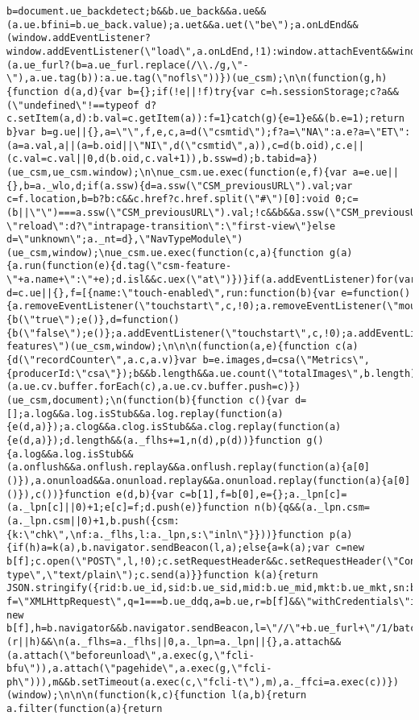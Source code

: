 \documentclass[
]{article}
\begin{document}
\begin{verbatim}
b=document.ue_backdetect;b&&b.ue_back&&a.ue&&(a.ue.bfini=b.ue_back.value);a.uet&&a.uet(\"be\");a.onLdEnd&&(window.addEventListener?window.addEventListener(\"load\",a.onLdEnd,!1):window.attachEvent&&window.attachEvent(\"onload\",a.onLdEnd));a.ueh&&a.ueh(0,window,\"load\",a.onLd,1);a.ue&&a.ue.tag&&(a.ue_furl?(b=a.ue_furl.replace(/\\./g,\"-\"),a.ue.tag(b)):a.ue.tag(\"nofls\"))})(ue_csm);\n\n(function(g,h){function d(a,d){var b={};if(!e||!f)try{var c=h.sessionStorage;c?a&&(\"undefined\"!==typeof d?c.setItem(a,d):b.val=c.getItem(a)):f=1}catch(g){e=1}e&&(b.e=1);return b}var b=g.ue||{},a=\"\",f,e,c,a=d(\"csmtid\");f?a=\"NA\":a.e?a=\"ET\":(a=a.val,a||(a=b.oid||\"NI\",d(\"csmtid\",a)),c=d(b.oid),c.e||(c.val=c.val||0,d(b.oid,c.val+1)),b.ssw=d);b.tabid=a})(ue_csm,ue_csm.window);\n\nue_csm.ue.exec(function(e,f){var a=e.ue||{},b=a._wlo,d;if(a.ssw){d=a.ssw(\"CSM_previousURL\").val;var c=f.location,b=b?b:c&&c.href?c.href.split(\"#\")[0]:void 0;c=(b||\"\")===a.ssw(\"CSM_previousURL\").val;!c&&b&&a.ssw(\"CSM_previousURL\",b);d=c?\"reload\":d?\"intrapage-transition\":\"first-view\"}else d=\"unknown\";a._nt=d},\"NavTypeModule\")(ue_csm,window);\nue_csm.ue.exec(function(c,a){function g(a){a.run(function(e){d.tag(\"csm-feature-\"+a.name+\":\"+e);d.isl&&c.uex(\"at\")})}if(a.addEventListener)for(var d=c.ue||{},f=[{name:\"touch-enabled\",run:function(b){var e=function(){a.removeEventListener(\"touchstart\",c,!0);a.removeEventListener(\"mousemove\",d,!0)},c=function(){b(\"true\");e()},d=function(){b(\"false\");e()};a.addEventListener(\"touchstart\",c,!0);a.addEventListener(\"mousemove\",d,!0)}}],b=0;b<f.length;b++)g(f[b])},\"csm-features\")(ue_csm,window);\n\n\n(function(a,e){function c(a){d(\"recordCounter\",a.c,a.v)}var b=e.images,d=csa(\"Metrics\",{producerId:\"csa\"});b&&b.length&&a.ue.count(\"totalImages\",b.length);a.ue.cv.buffer&&d&&(a.ue.cv.buffer.forEach(c),a.ue.cv.buffer.push=c)})(ue_csm,document);\n(function(b){function c(){var d=[];a.log&&a.log.isStub&&a.log.replay(function(a){e(d,a)});a.clog&&a.clog.isStub&&a.clog.replay(function(a){e(d,a)});d.length&&(a._flhs+=1,n(d),p(d))}function g(){a.log&&a.log.isStub&&(a.onflush&&a.onflush.replay&&a.onflush.replay(function(a){a[0]()}),a.onunload&&a.onunload.replay&&a.onunload.replay(function(a){a[0]()}),c())}function e(d,b){var c=b[1],f=b[0],e={};a._lpn[c]=(a._lpn[c]||0)+1;e[c]=f;d.push(e)}function n(b){q&&(a._lpn.csm=(a._lpn.csm||0)+1,b.push({csm:{k:\"chk\",\nf:a._flhs,l:a._lpn,s:\"inln\"}}))}function p(a){if(h)a=k(a),b.navigator.sendBeacon(l,a);else{a=k(a);var c=new b[f];c.open(\"POST\",l,!0);c.setRequestHeader&&c.setRequestHeader(\"Content-type\",\"text/plain\");c.send(a)}}function k(a){return JSON.stringify({rid:b.ue_id,sid:b.ue_sid,mid:b.ue_mid,mkt:b.ue_mkt,sn:b.ue_sn,reqs:a})}var f=\"XMLHttpRequest\",q=1===b.ue_ddq,a=b.ue,r=b[f]&&\"withCredentials\"in new b[f],h=b.navigator&&b.navigator.sendBeacon,l=\"//\"+b.ue_furl+\"/1/batch/1/OE/\",m=b.ue_fci_ft||5E3;a&&(r||h)&&\n(a._flhs=a._flhs||0,a._lpn=a._lpn||{},a.attach&&(a.attach(\"beforeunload\",a.exec(g,\"fcli-bfu\")),a.attach(\"pagehide\",a.exec(g,\"fcli-ph\"))),m&&b.setTimeout(a.exec(c,\"fcli-t\"),m),a._ffci=a.exec(c))})(window);\n\n\n(function(k,c){function l(a,b){return a.filter(function(a){return 
\end{verbatim}
\end{document}
